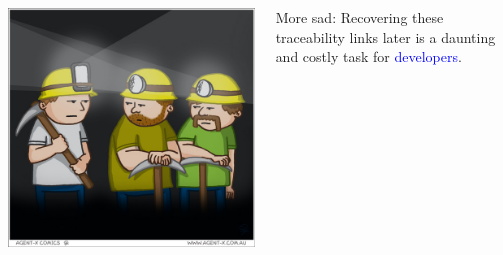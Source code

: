 \documentclass[12pt,hyperref=true,mathserif]{beamer}
\begin{document}
\begin{frame}
\begin{columns}
\begin{column}{0.5\textwidth}
\includegraphics[scale=0.25]{modern-miners}
\end{column}
\begin{column}{0.5\textwidth}
More sad: Recovering these traceability links later is a daunting and costly task for \textcolor{blue}{developers}.
\end{column}
\end{columns}
\end{frame}
\end{document}
